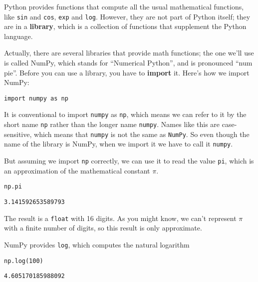 Python provides functions that compute all the usual mathematical
functions, like \passthrough{\lstinline!sin!} and
\passthrough{\lstinline!cos!}, \passthrough{\lstinline!exp!} and
\passthrough{\lstinline!log!}. However, they are not part of Python
itself; they are in a \textbf{library}, which is a collection of
functions that supplement the Python language.

Actually, there are several libraries that provide math functions; the
one we'll use is called NumPy, which stands for ``Numerical Python'',
and is pronounced ``num pie''. Before you can use a library, you have to
\textbf{import} it. Here's how we import NumPy:

\begin{lstlisting}[]
import numpy as np
\end{lstlisting}

It is conventional to import \passthrough{\lstinline!numpy!} as
\passthrough{\lstinline!np!}, which means we can refer to it by the
short name \passthrough{\lstinline!np!} rather than the longer name
\passthrough{\lstinline!numpy!}. Names like this are case-sensitive,
which means that \passthrough{\lstinline!numpy!} is not the same as
\passthrough{\lstinline!NumPy!}. So even though the name of the library
is NumPy, when we import it we have to call it
\passthrough{\lstinline!numpy!}.

But assuming we import \passthrough{\lstinline!np!} correctly, we can
use it to read the value \passthrough{\lstinline!pi!}, which is an
approximation of the mathematical constant \(\pi\).

\begin{lstlisting}[]
np.pi
\end{lstlisting}

\begin{lstlisting}[style=output]
3.141592653589793
\end{lstlisting}

The result is a \passthrough{\lstinline!float!} with 16 digits. As you
might know, we can't represent \(\pi\) with a finite number of digits,
so this result is only approximate.

NumPy provides \passthrough{\lstinline!log!}, which computes the natural
logarithm

\begin{lstlisting}[]
np.log(100)
\end{lstlisting}

\begin{lstlisting}[style=output]
4.605170185988092
\end{lstlisting}

